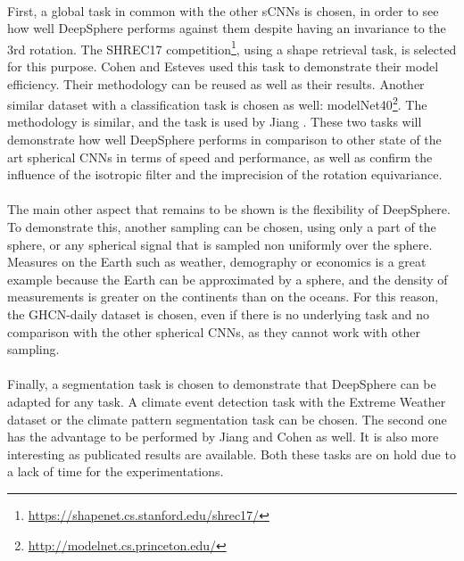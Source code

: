 \documentclass[11pt]{report}
\begin{document}
\paragraph*{}
First, a global task in common with the other sCNNs is chosen, in order to see how well DeepSphere performs against them despite having an invariance to the 3rd rotation. The SHREC17 competition\footnote{\protect\url{https://shapenet.cs.stanford.edu/shrec17/}}, using a shape retrieval task, is selected for this purpose. Cohen \cite{cohen_spherical_2018} and Esteves \cite{esteves_learning_2017} used this task to demonstrate their model efficiency. Their methodology can be reused as well as their results. Another similar dataset with a classification task is chosen as well:  modelNet40\footnote{\url{http://modelnet.cs.princeton.edu/}}. The methodology is similar, and the task is used by Jiang \cite{jiang_spherical_2019}. These two tasks will demonstrate how well DeepSphere performs in comparison to other state of the art spherical CNNs in terms of speed and performance, as well as confirm the influence of the isotropic filter and the imprecision of the rotation equivariance.
\paragraph*{}
The main other aspect that remains to be shown is the flexibility of DeepSphere. To demonstrate this, another sampling can be chosen, using only a part of the sphere, or any spherical signal that is sampled non uniformly over the sphere. Measures on the Earth such as weather, demography or economics is a great example because the Earth can be approximated by a sphere, and the density of measurements is greater on the continents than on the oceans. For this reason, the GHCN-daily \cite{noauthor_global_nodate} dataset is chosen, even if there is no underlying task and no comparison with the other spherical CNNs, as they cannot work with other sampling. 
\paragraph*{}
Finally, a segmentation task is chosen to demonstrate that DeepSphere can be adapted for any task. A climate event detection task with the Extreme Weather dataset \cite{racah_extremeweather:_2017} or the climate pattern segmentation task \cite{mudigonda_segmenting_nodate} can be chosen. The second one has the advantage to be performed by Jiang \cite{jiang_spherical_2019} and Cohen \cite{cohen_gauge_2019} as well. It is also more interesting as publicated results are available. Both these tasks are on hold due to a lack of time for the experimentations.
\end{document}
